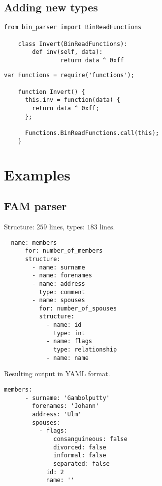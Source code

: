 \documentclass[slidestop]{beamer}
\begin{document}
\subsection{Adding new types}
\begin{pframe}
  \vspace{-0.5cm}
  \begin{lstlisting}[language=none, caption={Adding a type in Python.}]
    from bin_parser import BinReadFunctions

    class Invert(BinReadFunctions):
        def inv(self, data):
                return data ^ 0xff
  \end{lstlisting}

  \vspace{-0.5cm}
  \begin{lstlisting}[language=none, caption={Adding a type in JavaScript.}]
    var Functions = require('functions');

    function Invert() {
      this.inv = function(data) {
        return data ^ 0xff;
      };

      Functions.BinReadFunctions.call(this);
    }
  \end{lstlisting}
\end{pframe}

\section{Examples}
\subsection{FAM parser}
\begin{pframe}
  Structure: $259$ lines, types: $183$ lines.
  \begin{lstlisting}[language=none, caption={Structure snippet.}]
    - name: members
      for: number_of_members
      structure:
        - name: surname
        - name: forenames
        - name: address
          type: comment
        - name: spouses
          for: number_of_spouses
          structure:
            - name: id
              type: int
            - name: flags
              type: relationship
            - name: name
  \end{lstlisting}
\end{pframe}

\begin{pframe}
  Resulting output in YAML format.
  \begin{lstlisting}[language=none, caption={Output snippet.}]
    members:
      - surname: 'Gambolputty'
        forenames: 'Johann'
        address: 'Ulm'
        spouses:
          - flags:
              consanguineous: false
              divorced: false
              informal: false
              separated: false
            id: 2
            name: ''
  \end{lstlisting}
\end{pframe}
\end{document}
